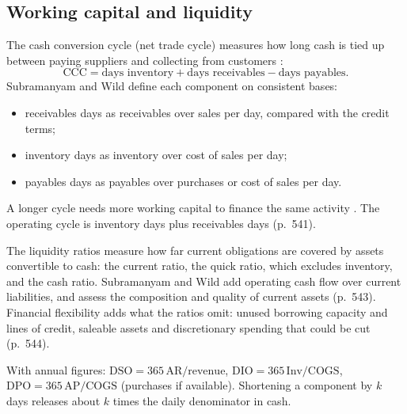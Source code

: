 \subsection{Working capital and liquidity}

\begin{qfmethod}\label{meth:cash-conversion-cycle}
 The cash conversion cycle (net trade cycle) measures how long cash is tied up between paying suppliers and collecting from customers \citep[sec.~19.1]{principles-of-finance-2026}:
\[ \text{CCC}=\text{days inventory}+\text{days receivables}-\text{days payables}. \]
Subramanyam and Wild define each component on consistent bases:
\begin{itemize}
\item receivables days as receivables over sales per day, compared with the credit terms;
\item inventory days as inventory over cost of sales per day;
\item payables days as payables over purchases or cost of sales per day.
\end{itemize}
A longer cycle needs more working capital to finance the same activity \citep[pp.~535--542]{financial-statement-analysis-2009}. The operating cycle is inventory days plus receivables days (p.~541).

The liquidity ratios measure how far current obligations are covered by assets convertible to cash: the current ratio, the quick ratio, which excludes inventory, and the cash ratio. Subramanyam and Wild add operating cash flow over current liabilities, and assess the composition and quality of current assets (p.~543). Financial flexibility adds what the ratios omit: unused borrowing capacity and lines of credit, saleable assets and discretionary spending that could be cut (p.~544).

 With annual figures: $\mathrm{DSO}=365\,\mathrm{AR}/\text{revenue}$, $\mathrm{DIO}=365\,\mathrm{Inv}/\mathrm{COGS}$, $\mathrm{DPO}=365\,\mathrm{AP}/\mathrm{COGS}$ (purchases if available). Shortening a component by $k$ days releases about $k$ times the daily denominator in cash.


\end{qfmethod}
